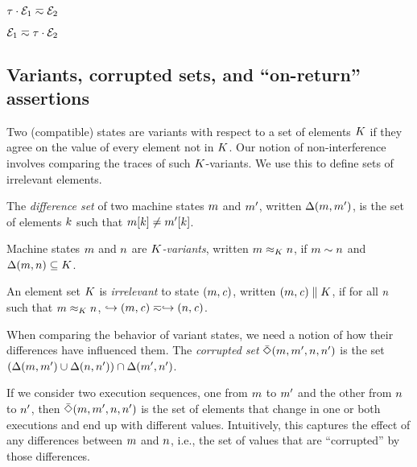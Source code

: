 \documentclass[10pt,conference]{ieeetran}%
\theoremstyle{definition}
\begin{document}
\begin{minipage}{.4\columnwidth}
           {\(\tau \cdot \mathcal{E}_1 \eqsim \mathcal{E}_2\)}
\end{minipage}
\begin{minipage}{.4\columnwidth}
           {\(\mathcal{E}_1 \eqsim \tau \cdot \mathcal{E}_2\)}
\end{minipage}

\subsection{Variants, corrupted sets, and ``on-return'' assertions}
\label{sec:props}

Two (compatible) states are variants with respect to a set of elements \(K\)
if they agree on the value of every element not in \(K\). 
Our notion of non-interference involves comparing the traces of such
\(K\)-variants. We use this to define sets of irrelevant elements.

 The \emph{difference set} of two machine states \(m\) and \(m'\),
written \(\Delta(m,m')\),
is the set of elements \(k\) such that \(m[k] \not = m'[k]\).

 Machine states \(m\) and \(n\) are {\em \(K\)-variants},
written \(m \approx_K n\), if \(m\sim n\) and
\(\Delta(m,n) \subseteq K\). 

 An element set \(K\) is \emph{irrelevant} to state \((m,\mathit{c})\),
written \((m,\mathit{c}) \parallel K\), if for all
\(n\) such that \(m \approx_{K} n\),
\(\hookrightarrow (m,\mathit{c})  \eqsim \hookrightarrow (n,\mathit{c})\).


When comparing the behavior of variant states, we need a notion of how their
differences have influenced them.
 The {\em corrupted set} \(\bar{\Diamond}(m,m',n,n')\)
is the set \((\Delta(m,m') \cup \Delta(n,n')) \cap \Delta(m',n')\).

If we consider two execution sequences, one from \(m\) to \(m'\)
and the other from \(n\) to \(n'\),
then \(\bar{\Diamond}(m,m',n,n')\) is the set of elements that
change in one or both executions and end up with different values. Intuitively,
this captures the effect of any differences between \(m\) and \(n\), i.e.,
the set of values that are ``corrupted'' by those differences.
\end{document}
